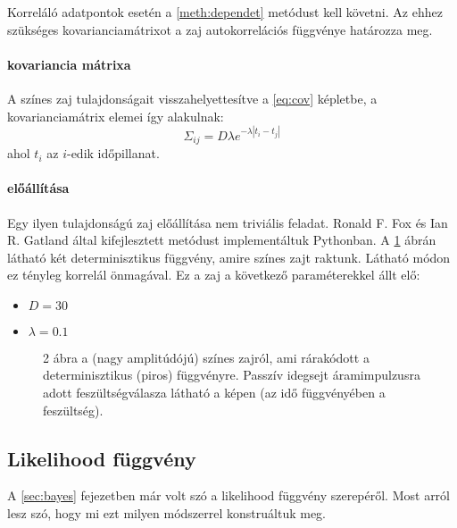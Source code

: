 Korreláló adatpontok esetén a \ref{meth:dependet} metódust kell követni. Az ehhez szükséges kovarianciamátrixot a zaj autokorrelációs függvénye határozza meg.

\paragraph{kovariancia mátrixa}
A színes zaj tulajdonságait visszahelyettesítve a \ref{eq:cov} képletbe, a kovarianciamátrix elemei így alakulnak:
\begin{equation}\label{eq:covmat_col}
\Sigma_{ij} = D\lambda e^{- \lambda |t_i - t_j|}
\end{equation}
ahol $t_i$ az $i$-edik időpillanat.

\paragraph{előállítása}
Egy ilyen tulajdonságú zaj előállítása nem triviális feladat. Ronald F. Fox és Ian R. Gatland által kifejlesztett metódust \cite{PhysRevA.38.5938} implementáltuk Pythonban.
A \ref{fig:colored} ábrán látható két determinisztikus függvény, amire színes zajt raktunk. Látható módon ez tényleg korrelál önmagával. Ez a zaj a következő paraméterekkel állt elő:
\begin{itemize}
	\item $D = 30$
	\item $\lambda = 0.1$
\end{itemize}

\begin{figure}
	\hfill
	\hfill
	\hfill
	\caption[Színes zaj]{2 ábra a (nagy amplitúdójú) színes zajról, ami rárakódott a determinisztikus (piros) függvényre. Passzív idegsejt áramimpulzusra adott feszültségválasza látható a képen (az idő függvényében a feszültség).}%
	\label{fig:colored}
\end{figure}

\FloatBarrier


\subsection{Likelihood függvény}\label{sec:likelihood}
A  \ref{sec:bayes} fejezetben már volt szó a likelihood függvény szerepéről. Most arról lesz szó, hogy mi ezt milyen módszerrel konstruáltuk meg.

